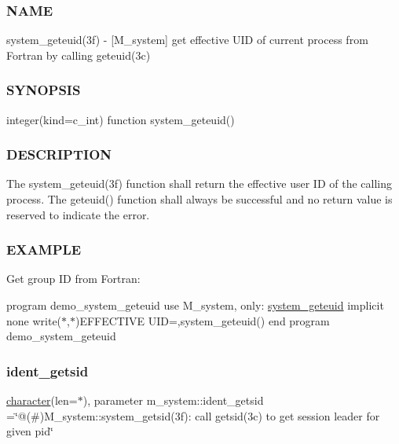 \subsubsection*{N\+A\+ME}

system\+\_\+geteuid(3f) -\/ \mbox{[}M\+\_\+system\mbox{]} get effective U\+ID of current process from Fortran by calling geteuid(3c) \subsubsection*{S\+Y\+N\+O\+P\+S\+IS}

integer(kind=c\+\_\+int) function system\+\_\+geteuid()

\subsubsection*{D\+E\+S\+C\+R\+I\+P\+T\+I\+ON}

The system\+\_\+geteuid(3f) function shall return the effective user ID of the calling process. The geteuid() function shall always be successful and no return value is reserved to indicate the error. \subsubsection*{E\+X\+A\+M\+P\+LE}

Get group ID from Fortran\+:

program demo\+\_\+system\+\_\+geteuid use M\+\_\+system, only\+: \hyperlink{interfacem__system_1_1system__geteuid}{system\+\_\+geteuid} implicit none write($\ast$,$\ast$)\textquotesingle{}E\+F\+F\+E\+C\+T\+I\+VE U\+ID=\textquotesingle{},system\+\_\+geteuid() end program demo\+\_\+system\+\_\+geteuid \mbox{\label{namespacem__system_a16a71dfbcb5290eef064fa7f628018bb}} 
\subsubsection{\texorpdfstring{ident\+\_\+getsid}{ident\_getsid}}
{\footnotesize\ttfamily \hyperlink{option__stopwatch_83_8txt_abd4b21fbbd175834027b5224bfe97e66}{character}(len=$\ast$), parameter m\+\_\+system\+::ident\+\_\+getsid =\char`\"{}@(\#)M\+\_\+system\+::system\+\_\+getsid(3f)\+: call getsid(3c) to get session leader for given pid\char`\"{}\hspace{0.3cm}{\ttfamily [private]}}



